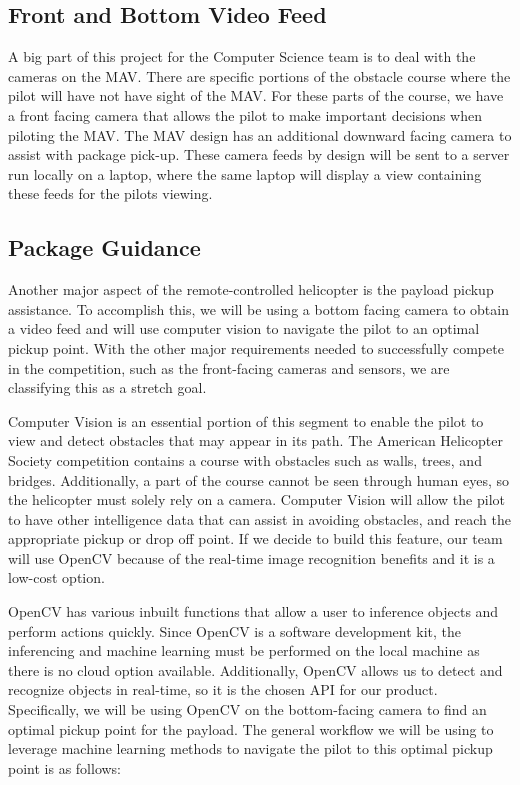 \documentclass[onecolumn, oneside, letterpaper, draftclsnofoot, 10pt, compsoc]{IEEEtran}
\begin{document}
\subsection{Front and Bottom Video Feed}
A big part of this project for the Computer Science team is to deal with the cameras on the MAV. There are specific portions of the obstacle course where the pilot will have not have sight of the MAV. For these parts of the course, we have a front facing camera that allows the pilot to make important decisions when piloting the MAV. The MAV design has an additional downward facing camera to assist with package pick-up. These camera feeds by design will be sent to a server run locally on a laptop, where the same laptop will display a view containing these feeds for the pilot\textquotesingle s viewing.


\subsection{Package Guidance}
Another major aspect of the remote-controlled helicopter is the payload pickup assistance. To accomplish this, we will be using a bottom facing camera to obtain a video feed and will use computer vision to navigate the pilot to an optimal pickup point. With the other major requirements needed to successfully compete in the competition, such as the front-facing cameras and sensors, we are classifying this as a stretch goal.

\noindent
Computer Vision is an essential portion of this segment to enable the pilot to view and detect obstacles that may appear in its path. The American Helicopter Society competition contains a course with obstacles such as walls, trees, and bridges. Additionally, a part of the course cannot be seen through human eyes, so the helicopter must solely rely on a camera. Computer Vision will allow the pilot to have other intelligence data that can assist in avoiding obstacles, and reach the appropriate pickup or drop off point. If we decide to build this feature, our team will use OpenCV because of the real-time image recognition benefits and it is a low-cost option.

\noindent
OpenCV has various inbuilt functions that allow a user to inference objects and perform actions quickly. Since OpenCV is a software development kit, the inferencing and machine learning must be performed on the local machine as there is no cloud option available. Additionally, OpenCV allows us to detect and recognize objects in real-time, so it is the chosen API for our product. Specifically, we will be using OpenCV on the bottom-facing camera to find an optimal pickup point for the payload. The general workflow we will be using to leverage machine learning methods to navigate the pilot to this optimal pickup point is as follows:
\end{document}
